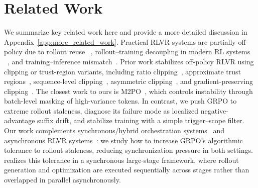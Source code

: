 \section{Related Work}
\label{sec:relatedworks}
We summarize key related work here and provide a more detailed discussion
in Appendix~\ref{app:more_related_work}. Practical RLVR systems are partially
off-policy due to rollout reuse
~\citep{shao2024deepseekmathpushinglimitsmathematical,
huggingface_openr1_update3}, rollout--training decoupling in modern RL systems
~\citep{sheng2025hybridflow, slime_github, fu2025areal,
noukhovitch2024asynchronous, zhong2025streamrl, he2025history}, and
training--inference mismatch~\citep{qi2025defeating}. Prior work stabilizes
off-policy RLVR using clipping or trust-region variants, including ratio
clipping~\citep{yu2025dapoopensourcellmreinforcement}, approximate trust
regions~\citep{fu2025areal}, sequence-level clipping~\citep{zheng2025group},
asymmetric clipping~\citep{roux2025tapered, arnal2025asymmetric}, and
gradient-preserving clipping~\citep{su2025klear, chen2025minimax}. The closest
work to ours is M2PO~\citep{zheng2025prosperitycollapsefaroffpolicy}, which
controls instability through batch-level masking of high-variance tokens. In
contrast, we push GRPO to extreme rollout staleness, diagnose its failure mode as
localized negative-advantage suffix drift, and stabilize training with a simple
trigger--scope filter. Our work complements synchronous/hybrid
orchestration systems~\citep{sheng2025hybridflow, slime_github} and
asynchronous RLVR systems~\citep{fu2025areal, zhong2025streamrl,
han2025asyncflow, noukhovitch2024asynchronous}: we study how to increase GRPO's
algorithmic tolerance to rollout staleness, reducing synchronization
pressure in both settings. \ourmethod{} realizes this tolerance in a synchronous large-stage framework, where rollout generation and optimization are executed sequentially across stages rather than overlapped in parallel asynchronously.